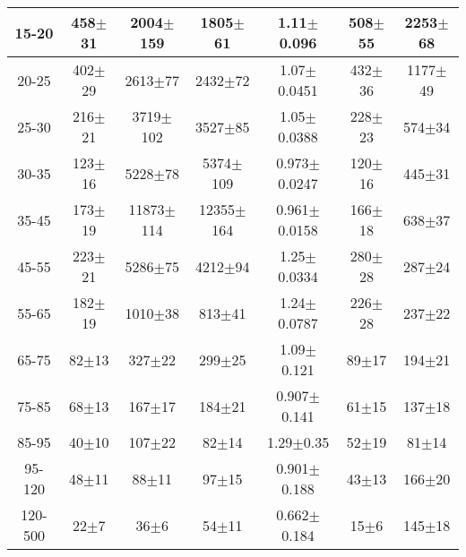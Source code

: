 \begin{table}[h]
\begin{center}
\begin{tabular}{|c|c|c|c|c|c|c|}
15-20 & 458$\pm$31 & 2004$\pm$159 & 1805$\pm$61 & 1.11$\pm$0.096& 508$\pm$55& 2253$\pm$68 \\ \hline
20-25 & 402$\pm$29 & 2613$\pm$77 & 2432$\pm$72 & 1.07$\pm$0.0451& 432$\pm$36& 1177$\pm$49 \\ \hline
25-30 & 216$\pm$21 & 3719$\pm$102 & 3527$\pm$85 & 1.05$\pm$0.0388& 228$\pm$23& 574$\pm$34 \\ \hline
30-35 & 123$\pm$16 & 5228$\pm$78 & 5374$\pm$109 & 0.973$\pm$0.0247& 120$\pm$16& 445$\pm$31 \\ \hline
35-45 & 173$\pm$19 & 11873$\pm$114 & 12355$\pm$164 & 0.961$\pm$0.0158& 166$\pm$18& 638$\pm$37 \\ \hline
45-55 & 223$\pm$21 & 5286$\pm$75 & 4212$\pm$94 & 1.25$\pm$0.0334& 280$\pm$28& 287$\pm$24 \\ \hline
55-65 & 182$\pm$19 & 1010$\pm$38 & 813$\pm$41 & 1.24$\pm$0.0787& 226$\pm$28& 237$\pm$22 \\ \hline
65-75 & 82$\pm$13 & 327$\pm$22 & 299$\pm$25 & 1.09$\pm$0.121& 89$\pm$17& 194$\pm$21 \\ \hline
75-85 & 68$\pm$13 & 167$\pm$17 & 184$\pm$21 & 0.907$\pm$0.141& 61$\pm$15& 137$\pm$18 \\ \hline
85-95 & 40$\pm$10 & 107$\pm$22 & 82$\pm$14 & 1.29$\pm$0.35& 52$\pm$19& 81$\pm$14 \\ \hline
95-120 & 48$\pm$11 & 88$\pm$11 & 97$\pm$15 & 0.901$\pm$0.188& 43$\pm$13& 166$\pm$20 \\ \hline
120-500 & 22$\pm$7 & 36$\pm$6 & 54$\pm$11 & 0.662$\pm$0.184& 15$\pm$6& 145$\pm$18 \\ \hline
  \end{tabular}
  \label{tab:EtoGAMMA_1}
  \end{center}
\end{table}


